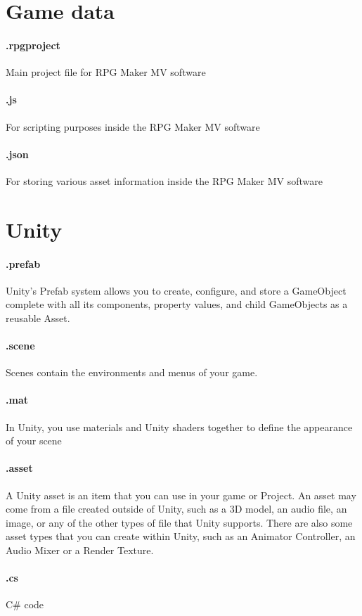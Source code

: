 \section{Game data}
\paragraph{.rpgproject}
		 Main project file for RPG Maker MV software 

\paragraph{.js} For scripting purposes inside the RPG Maker MV software

\paragraph{.json} For storing various asset information inside the RPG Maker MV software

\section{Unity}

\paragraph{.prefab} Unity’s Prefab system allows you to create, configure, and store a GameObject complete with all its components, property values, and child GameObjects
 as a reusable Asset.
\paragraph{.scene} Scenes contain the environments and menus of your game.
\paragraph{.mat} In Unity, you use materials and Unity shaders together to define the appearance of your scene
\paragraph{.asset} A Unity asset is an item that you can use in your game or Project. An asset may come from a file created outside of Unity, such as a 3D model, an audio file, an image, or any of the other types of file that Unity supports. There are also some asset types that you can create within Unity, such as an Animator Controller, an Audio Mixer or a Render Texture.
\paragraph{.cs} C\# code









\pagebreak